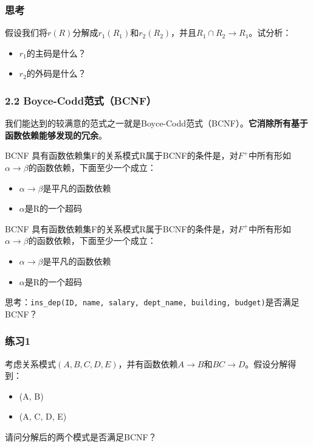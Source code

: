 \documentclass[aspectratio=169, 14pt]{beamer}
\begin{document}
\begin{frame}
	\frametitle{思考}
	假设我们将$r(R)$分解成$r_1(R_1)$和$r_2(R_2)$，并且$R_1 \cap R_2 \rightarrow R_1$。试分析：

	\begin{itemize}
		\item $r_1$的主码是什么？
		\item $r_2$的外码是什么？
	\end{itemize}


\end{frame}

\begin{frame}
	\frametitle{2.2 Boyce-Codd范式（BCNF）}
	我们能达到的较满意的范式之一就是\alert{Boyce-Codd范式}（BCNF）。\textbf{它消除所有基于函数依赖能够发现的冗余}。


	\begin{exampleblock}{BCNF}
		具有函数依赖集F的关系模式R属于BCNF的条件是，对$F^+$中所有形如$\alpha \rightarrow \beta$的函数依赖，下面至少一个成立：
		\begin{itemize}
			\item $\alpha \rightarrow \beta$是平凡的函数依赖
			\item $\alpha$是R的一个超码
		\end{itemize}

	\end{exampleblock}

\end{frame}

\begin{frame}

	\begin{exampleblock}{BCNF}
		具有函数依赖集F的关系模式R属于BCNF的条件是，对$F^+$中所有形如$\alpha \rightarrow \beta$的函数依赖，下面至少一个成立：
		\begin{itemize}
			\item $\alpha \rightarrow \beta$是平凡的函数依赖
			\item $\alpha$是R的一个超码
		\end{itemize}

	\end{exampleblock}

	 思考：\texttt{ins\_dep(ID, name, salary, dept\_name, building, budget)}是否满足BCNF？

\end{frame}

\begin{frame}
	\frametitle{练习1}
	考虑关系模式$(A, B, C, D, E)$，并有函数依赖$A \rightarrow B$和$BC \rightarrow D$。假设分解得到：

	\begin{itemize}
		\item (A, B)
		\item (A, C, D, E)
	\end{itemize}

	请问分解后的两个模式是否满足BCNF？


\end{frame}
\end{document}
